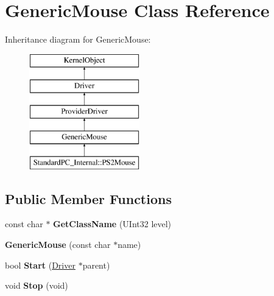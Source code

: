 \hypertarget{class_generic_mouse}{}\section{Generic\+Mouse Class Reference}
\label{class_generic_mouse}
Inheritance diagram for Generic\+Mouse\+:\begin{figure}[H]
\begin{center}
\leavevmode
\includegraphics[height=5.000000cm]{class_generic_mouse}
\end{center}
\end{figure}
\subsection*{Public Member Functions}
\begin{DoxyCompactItemize}
\item 
\mbox{\label{class_generic_mouse_a89c7ce7169444a492e8246ed4162839a}} 
const char $\ast$ {\bfseries Get\+Class\+Name} (U\+Int32 level)
\item 
\mbox{\label{class_generic_mouse_abc932bc5a5d13890cf4478689fb0353c}} 
{\bfseries Generic\+Mouse} (const char $\ast$name)
\item 
\mbox{\label{class_generic_mouse_afe652111afa403e7407b91e50f1a77d6}} 
bool {\bfseries Start} (\hyperlink{class_driver}{Driver} $\ast$parent)
\item 
\mbox{\label{class_generic_mouse_a17a3923ab25e4826add22fc73b9b1e40}} 
void {\bfseries Stop} (void)
\end{DoxyCompactItemize}
